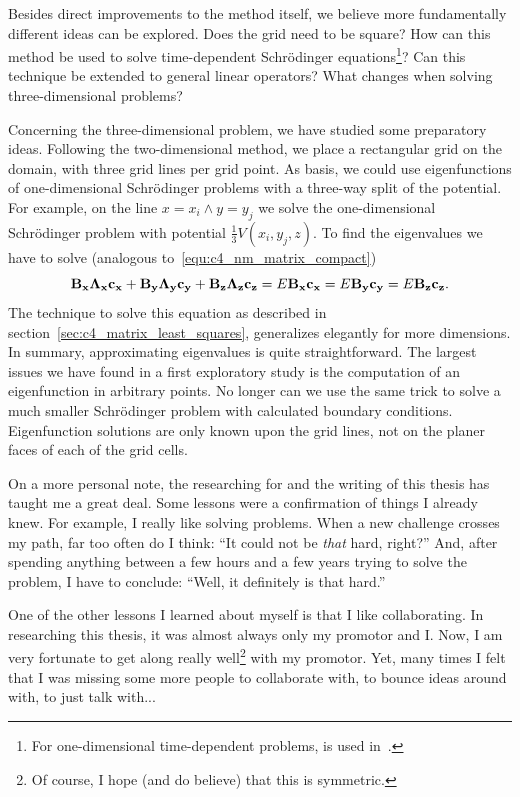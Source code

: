 Besides direct improvements to the method itself, we believe more fundamentally different ideas can be explored. Does the grid need to be square? How can this method be used to solve time-dependent Schrödinger equations\footnote{For one-dimensional time-dependent problems,  is used in~\cite{ledoux_accurate_2014}.}? Can this technique be extended to general linear operators? What changes when solving three-dimensional problems?

Concerning the three-dimensional problem, we have studied some preparatory ideas. Following the two-dimensional method, we place a rectangular grid on the domain, with three grid lines per grid point. As basis, we could use eigenfunctions of one-dimensional Schrödinger problems with a three-way split of the potential. For example, on the line $x = x_i \land y = y_j$ we solve the one-dimensional Schrödinger problem with potential $\frac{1}{3} V(x_i, y_j, z)$. To find the eigenvalues we have to solve (analogous to~\eqref{equ:c4_nm_matrix_compact})
$$
    \vb{B_x} \vb{\Lambda_x}\vb{c_x} + \vb{B_y} \vb{\Lambda_y}\vb{c_y} + \vb{B_z} \vb{\Lambda_z}\vb{c_z} = E \vb{B_x} \vb{c_x} = E \vb{B_y} \vb{c_y} = E \vb{B_z} \vb{c_z}\text{.}
$$
The technique to solve this equation as described in section~\ref{sec:c4_matrix_least_squares}, generalizes elegantly for more dimensions. In summary, approximating eigenvalues is quite straightforward. The largest issues we have found in a first exploratory study is the computation of an eigenfunction in arbitrary points. No longer can we use the same trick to solve a much smaller Schrödinger problem with calculated boundary conditions. Eigenfunction solutions are only known upon the grid lines, not on the planer faces of each of the grid cells.

On a more personal note, the researching for and the writing of this thesis has taught me a great deal. Some lessons were a confirmation of things I already knew. For example, I really like solving problems. When a new challenge crosses my path, far too often do I think: ``It could not be \emph{that} hard, right?'' And, after spending anything between a few hours and a few years trying to solve the problem, I have to conclude: ``Well, it definitely is that hard.''

One of the other lessons I learned about myself is that I like collaborating. In researching this thesis, it was almost always only my promotor and I. Now, I am very fortunate to get along really well\footnote{Of course, I hope (and do believe) that this is symmetric.} with my promotor. Yet, many times I felt that I was missing some more people to collaborate with, to bounce ideas around with, to just talk with...

